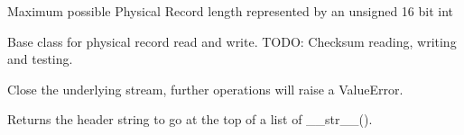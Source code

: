 \documentclass[letterpaper,10pt,english]{sphinxmanual}
\begin{document}

\begin{fulllineitems}
\label{\detokenize{ref/LIS/core/PhysRec:TotalDepth.LIS.core.PhysRec.PR_MAX_LENGTH}}
Maximum possible Physical Record length represented by an unsigned 16 bit int

\end{fulllineitems}


\begin{fulllineitems}
\label{\detokenize{ref/LIS/core/PhysRec:TotalDepth.LIS.core.PhysRec.PhysRecBase}}
Base class for physical record read and write.
TODO: Checksum reading, writing and testing.

\begin{fulllineitems}
\label{\detokenize{ref/LIS/core/PhysRec:TotalDepth.LIS.core.PhysRec.PhysRecBase.close}}
Close the underlying stream, further operations will raise a
ValueError.

\end{fulllineitems}


\begin{fulllineitems}
\label{\detokenize{ref/LIS/core/PhysRec:TotalDepth.LIS.core.PhysRec.PhysRecBase.strHeader}}
Returns the header string to go at the top of a list of \_\_str\_\_().

\end{fulllineitems}


\end{fulllineitems}

\end{document}

